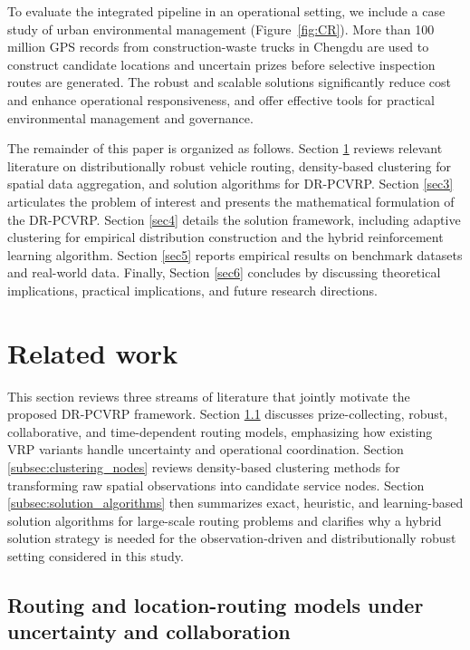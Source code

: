 \documentclass[preprint,12pt,authoryear]{elsarticle}
\theoremstyle{definition}
\begin{document}
To evaluate the integrated pipeline in an operational setting, we include a case study of urban environmental management (Figure~\ref{fig:CR}). More than 100 million GPS records from construction-waste trucks in Chengdu are used to construct candidate locations and uncertain prizes before selective inspection routes are generated. The robust and scalable solutions significantly reduce cost and enhance operational responsiveness, and offer effective tools for practical environmental management and governance.






The remainder of this paper is organized as follows. Section \ref{sec2} reviews relevant literature on distributionally robust vehicle routing, density-based clustering for spatial data aggregation, and solution algorithms for DR-PCVRP. Section \ref{sec3} articulates the problem of interest and presents the mathematical formulation of the DR-PCVRP. Section \ref{sec4} details the solution framework, including adaptive clustering for empirical distribution construction and the hybrid reinforcement learning algorithm. Section \ref{sec5} reports empirical results on benchmark datasets and real-world data. Finally, Section \ref{sec6} concludes by discussing theoretical implications, practical implications, and future research directions.

\section{Related work}\label{sec2}


This section reviews three streams of literature that jointly motivate the proposed DR-PCVRP framework. Section \ref{subsec:routing_uncertainty} discusses prize-collecting, robust, collaborative, and time-dependent routing models, emphasizing how existing VRP variants handle uncertainty and operational coordination. Section \ref{subsec:clustering_nodes} reviews density-based clustering methods for transforming raw spatial observations into candidate service nodes. Section \ref{subsec:solution_algorithms} then summarizes exact, heuristic, and learning-based solution algorithms for large-scale routing problems and clarifies why a hybrid solution strategy is needed for the observation-driven and distributionally robust setting considered in this study.


\subsection{Routing and location-routing models under uncertainty and collaboration}\label{subsec:routing_uncertainty}
\end{document}
